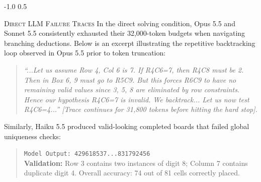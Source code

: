 \documentclass{article} %
\makeatletter
\renewcommand{\subsection}{\@startsection{subsection}{2}{\z@}%
  {-1.0\baselineskip}%
  {0.5\baselineskip}%
  {\normalfont\fontsize{10}{11}\selectfont\raggedright\scshape}}
\makeatother
\begin{document}
\subsection{\textsc{Direct LLM Failure Traces}}
In the direct solving condition, Opus 5.5 and Sonnet 5.5 consistently exhausted their 32,000-token budgets when navigating branching deductions. Below is an excerpt illustrating the repetitive backtracking loop observed in Opus 5.5 prior to token truncation:
\begin{quote}
\small
\textit{``...Let us assume Row 4, Col 6 is 7. If R4C6=7, then R4C8 must be 2. Then in Box 6, 9 must go to R5C9. But this forces R6C9 to have no remaining valid values since 3, 5, 8 are eliminated by row constraints. Hence our hypothesis R4C6=7 is invalid. We backtrack... Let us now test R4C6=4...'' [Trace continues for 31,800 tokens before hitting the hard stop].}
\end{quote}
Similarly, Haiku 5.5 produced valid-looking completed boards that failed global uniqueness checks:
\begin{quote}
\small
\texttt{Model Output: 429618537...831792456}\\
\textbf{Validation:} Row 3 contains two instances of digit 8; Column 7 contains duplicate digit 4. Overall accuracy: 74 out of 81 cells correctly placed.
\end{quote}
\end{document}
